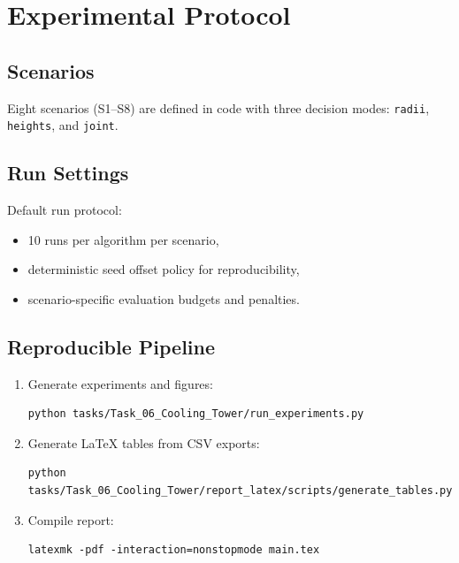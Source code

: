 \chapter{Experimental Protocol}

\section{Scenarios}
Eight scenarios (S1--S8) are defined in code with three decision modes:
\texttt{radii}, \texttt{heights}, and \texttt{joint}.

\section{Run Settings}
Default run protocol:
\begin{itemize}[leftmargin=1.5em]
\item 10 runs per algorithm per scenario,
\item deterministic seed offset policy for reproducibility,
\item scenario-specific evaluation budgets and penalties.
\end{itemize}

\section{Reproducible Pipeline}
\begin{enumerate}[leftmargin=1.5em]
\item Generate experiments and figures:
\begin{verbatim}
python tasks/Task_06_Cooling_Tower/run_experiments.py
\end{verbatim}
\item Generate LaTeX tables from CSV exports:
\begin{verbatim}
python tasks/Task_06_Cooling_Tower/report_latex/scripts/generate_tables.py
\end{verbatim}
\item Compile report:
\begin{verbatim}
latexmk -pdf -interaction=nonstopmode main.tex
\end{verbatim}
\end{enumerate}
